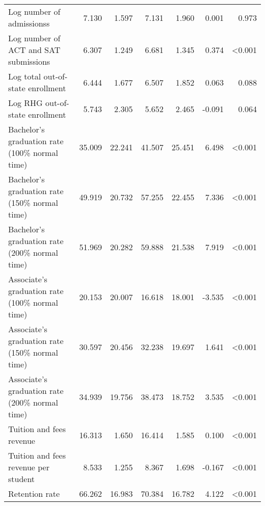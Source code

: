 \begin{table}
\begin{tabular}[t]{lrrrrrr}
Log number of  admissionss & 7.130 & 1.597 & 7.131 & 1.960 & 0.001 & 0.973\\
Log number of ACT and SAT submissions & 6.307 & 1.249 & 6.681 & 1.345 & 0.374 & <0.001\\
Log total out-of-state enrollment & 6.444 & 1.677 & 6.507 & 1.852 & 0.063 & 0.088\\
Log RHG out-of-state enrollment & 5.743 & 2.305 & 5.652 & 2.465 & -0.091 & 0.064\\
Bachelor’s graduation rate (100\% normal time) & 35.009 & 22.241 & 41.507 & 25.451 & 6.498 & <0.001\\
Bachelor’s graduation rate (150\% normal time) & 49.919 & 20.732 & 57.255 & 22.455 & 7.336 & <0.001\\
Bachelor’s graduation rate (200\% normal time) & 51.969 & 20.282 & 59.888 & 21.538 & 7.919 & <0.001\\
Associate’s graduation rate (100\% normal time) & 20.153 & 20.007 & 16.618 & 18.001 & -3.535 & <0.001\\
Associate’s graduation rate (150\% normal time) & 30.597 & 20.456 & 32.238 & 19.697 & 1.641 & <0.001\\
Associate’s graduation rate (200\% normal time) & 34.939 & 19.756 & 38.473 & 18.752 & 3.535 & <0.001\\
Tuition and fees revenue & 16.313 & 1.650 & 16.414 & 1.585 & 0.100 & <0.001\\
Tuition and fees revenue per student & 8.533 & 1.255 & 8.367 & 1.698 & -0.167 & <0.001\\
Retention rate & 66.262 & 16.983 & 70.384 & 16.782 & 4.122 & <0.001\\
\bottomrule
\end{tabular}
\end{table}
